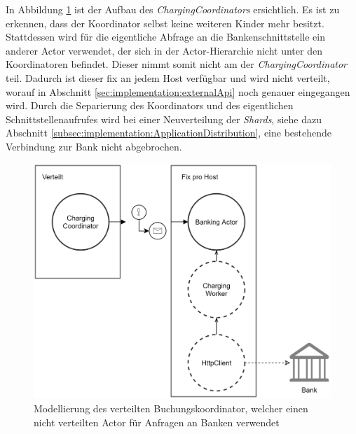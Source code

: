 In Abbildung \ref{fig:implementation:ChargingCoordinatorSample} ist der Aufbau des \textit{ChargingCoordinators} ersichtlich. Es ist zu erkennen, dass der Koordinator selbst keine weiteren Kinder mehr besitzt. Stattdessen wird für die eigentliche Abfrage an die Bankenschnittstelle ein anderer Actor verwendet, der sich in der Actor-Hierarchie nicht unter den Koordinatoren befindet. Dieser nimmt somit nicht am  der \textit{ChargingCoordinator} teil. Dadurch ist dieser fix an jedem Host verfügbar und wird nicht verteilt, worauf in Abschnitt \ref{sec:implementation:externalApi} noch genauer eingegangen wird. Durch die Separierung des Koordinators und des eigentlichen Schnittstellenaufrufes wird bei einer Neuverteilung der \textit{Shards}, siehe dazu Abschnitt \ref{subsec:implementation:ApplicationDistribution}, eine bestehende Verbindung zur Bank nicht abgebrochen. 
\begin{figure}
  \centering
  \includegraphics[width=0.65\linewidth]{gfx/implementation/ChargingCoordinatorSample}
  \caption{Modellierung des verteilten Buchungskoordinator, welcher einen nicht verteilten Actor für Anfragen an Banken verwendet}
  \label{fig:implementation:ChargingCoordinatorSample}
\end{figure}


